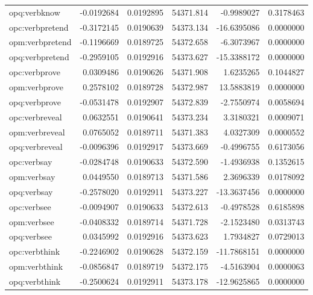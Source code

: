 \documentclass[12pt, a4paper]{article}
\begin{document}
\begin{table}[ht]
\begin{tabular}{lrrrrr}
		opq:verbknow & -0.0192684 & 0.0192895 & 54371.814 & -0.9989027 & 0.3178463\\
		opc:verbpretend & -0.3172145 & 0.0190639 & 54373.134 & -16.6395086 & 0.0000000\\
		opm:verbpretend & -0.1196669 & 0.0189725 & 54372.658 & -6.3073967 & 0.0000000\\
		opq:verbpretend & -0.2959105 & 0.0192916 & 54373.627 & -15.3388172 & 0.0000000\\
		\addlinespace
		opc:verbprove & 0.0309486 & 0.0190626 & 54371.908 & 1.6235265 & 0.1044827\\
		opm:verbprove & 0.2578102 & 0.0189728 & 54372.987 & 13.5883819 & 0.0000000\\
		opq:verbprove & -0.0531478 & 0.0192907 & 54372.839 & -2.7550974 & 0.0058694\\
		opc:verbreveal & 0.0632551 & 0.0190641 & 54373.234 & 3.3180321 & 0.0009071\\
		opm:verbreveal & 0.0765052 & 0.0189711 & 54371.383 & 4.0327309 & 0.0000552\\
		\addlinespace
		opq:verbreveal & -0.0096396 & 0.0192917 & 54373.669 & -0.4996755 & 0.6173056\\
		opc:verbsay & -0.0284748 & 0.0190633 & 54372.590 & -1.4936938 & 0.1352615\\
		opm:verbsay & 0.0449550 & 0.0189713 & 54371.586 & 2.3696339 & 0.0178092\\
		opq:verbsay & -0.2578020 & 0.0192911 & 54373.227 & -13.3637456 & 0.0000000\\
		opc:verbsee & -0.0094907 & 0.0190633 & 54372.613 & -0.4978528 & 0.6185898\\
		\addlinespace
		opm:verbsee & -0.0408332 & 0.0189714 & 54371.728 & -2.1523480 & 0.0313743\\
		opq:verbsee & 0.0345992 & 0.0192916 & 54373.623 & 1.7934827 & 0.0729013\\
		opc:verbthink & -0.2246902 & 0.0190628 & 54372.159 & -11.7868151 & 0.0000000\\
		opm:verbthink & -0.0856847 & 0.0189719 & 54372.175 & -4.5163904 & 0.0000063\\
		opq:verbthink & -0.2500624 & 0.0192911 & 54373.178 & -12.9625865 & 0.0000000\\
		\bottomrule
	\end{tabular}
\end{table}

\newpage
\end{document}
